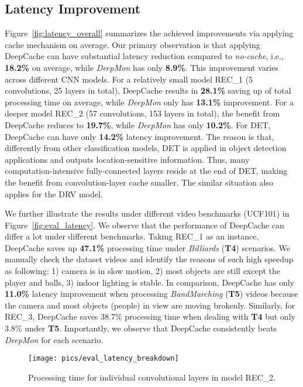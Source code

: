 \documentclass[10pt,acmtog]{acmart}
\newcommand{\framework}{DeepCache\xspace}
\begin{document}
\subsection{Latency Improvement}
Figure~\ref{fig:latency_overall} summarizes the achieved improvements via applying cache mechanism on average.
Our primary observation is that applying \framework can have substantial latency reduction compared to \emph{no-cache}, i.e., \textbf{18.2\%} on average, while \emph{DeepMon} has only \textbf{8.9\%}.
This improvement varies across different CNN models.
For a relatively small model REC\_1 (5 convolutions, 25 layers in total), \framework results in \textbf{28.1\%} saving up of total processing time on average, while \emph{DeepMon} only has \textbf{13.1\%} improvement.
For a deeper model REC\_2 (57 convolutions, 153 layers in total), the benefit from \framework reduces to \textbf{19.7\%}, while \emph{DeepMon} has only \textbf{10.2\%}.
For DET, \framework can have only \textbf{14.2\%} latency improvement.
The reason is that, differently from other classification models, DET is applied in object detection applications and outputs location-sensitive information.
Thus, many computation-intensive fully-connected layers reside at the end of DET, making the benefit from convolution-layer cache smaller.
The similar situation also applies for the DRV model.

We further illustrate the results under different video benchmarks (UCF101) in Figure~\ref{fig:eval_latency}.
We observe that the performance of \framework can differ a lot under different benchmarks.
Taking REC\_1 as an instance, \framework saves up \textbf{47.1\%} processing time under \emph{Billiards} (\textbf{T4}) scenarios.
We manually check the dataset videos and identify the reasons of such high speedup as following: 1) camera is in slow motion, 2) most objects are still except the player and balls, 3) indoor lighting is stable.
In comparison, \framework has only \textbf{11.0\%} latency improvement when processing \emph{BandMarching} (\textbf{T5}) videos because the camera and most objects (people) in view are moving brokenly.
Similarly, for REC\_3, \framework saves 38.7\% processing time when dealing with \textbf{T4} but only 3.8\% under \textbf{T5}.
Importantly, we observe that \framework consistently beats \emph{DeepMon} for each scenario.

\begin{figure}[t]
	\centering
	\texttt{[image: pics/eval\_latency\_breakdown]}
	\caption{Processing time for individual convolutional layers in model REC\_2.}
	\label{fig:eval_latency_breakdown}
\end{figure}
\end{document}
